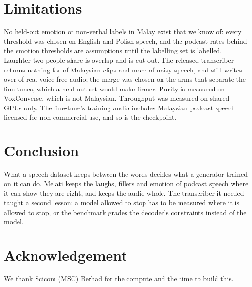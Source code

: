 \documentclass[10pt]{article}
\begin{document}
\section{Limitations}

No held-out emotion or non-verbal labels in Malay exist that we know of: every threshold was chosen on English and
Polish speech, and the podcast rates behind the emotion thresholds are assumptions until the labelling set is
labelled. Laughter two people share is overlap and is cut out. The released transcriber returns nothing for  of Malaysian clips and more of
noisy speech, and still writes over  of real voice-free audio; the merge was chosen on the
arms that separate the fine-tunes, which a held-out set would make firmer. Purity is measured on VoxConverse, which
is not Malaysian. Throughput was measured on shared GPUs only. The fine-tune's training audio includes Malaysian
podcast speech licensed for non-commercial use, and so is the checkpoint.

\section{Conclusion}

What a speech dataset keeps between the words decides what a generator trained on it can do. Melati keeps the
laughs, fillers and emotion of podcast speech where it can show they are right, and keeps the audio whole. The
transcriber it needed taught a second lesson: a model allowed to stop has to be measured where it is allowed to
stop, or the benchmark grades the decoder's constraints instead of the model.

\section*{Acknowledgement}

We thank Scicom (MSC) Berhad for the compute and the time to build this.



\end{document}
